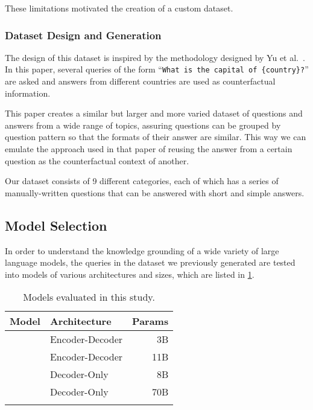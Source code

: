 These limitations motivated the creation of a custom dataset.

\subsubsection{Dataset Design and Generation}

The design of this dataset is inspired by the methodology designed by Yu et al.\ \cite{factual_recall}.
In this paper, several queries of the form ``\texttt{What is the capital of \{country\}?}'' are asked and answers from different countries are used as counterfactual information.

This paper creates a similar but larger and more varied dataset of questions and answers from a wide range of topics, assuring questions can be grouped by question pattern so that the formats of their answer are similar.
This way we can emulate the approach used in that paper of reusing the answer from a certain question as the counterfactual context of another.

Our dataset consists of 9 different categories, each of which has a series of manually-written questions that can be answered with short and simple answers.

\subsection{Model Selection}
\label{model_selection}

In order to understand the knowledge grounding of a wide variety of large language
models, the queries in the dataset we previously generated are tested into models of various architectures and sizes, which are listed in \cref{model_list}.

\begin{table}[htb]
	\centering
	\footnotesize
	\begin{tabular}{l l r}
		\toprule
			Model             & Architecture    & Params \\
		\midrule
			\smallflan{}      & Encoder-Decoder & 3B          \\
			\bigflan{}        & Encoder-Decoder & 11B         \\
			\smallllama{}    & Decoder-Only    & 8B          \\
			\bigllama{} & Decoder-Only    & 70B         \\
		\bottomrule \addlinespace[4pt]
	\end{tabular}
	\caption{Models evaluated in this study.}
	\label{model_list}
\end{table}

